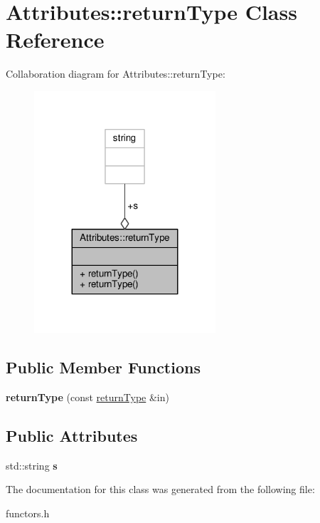 \hypertarget{classAttributes_1_1returnType}{}\section{Attributes\+:\+:return\+Type Class Reference}
\label{classAttributes_1_1returnType}


Collaboration diagram for Attributes\+:\+:return\+Type\+:
\nopagebreak
\begin{figure}[H]
\begin{center}
\leavevmode
\includegraphics[width=191pt]{da/def/classAttributes_1_1returnType__coll__graph}
\end{center}
\end{figure}
\subsection*{Public Member Functions}
\begin{DoxyCompactItemize}
\item 
{\bfseries return\+Type} (const \hyperlink{classAttributes_1_1returnType}{return\+Type} \&in)\hypertarget{classAttributes_1_1returnType_a264a6a93ae35497ce54e62e22d55b5af}{}\label{classAttributes_1_1returnType_a264a6a93ae35497ce54e62e22d55b5af}

\end{DoxyCompactItemize}
\subsection*{Public Attributes}
\begin{DoxyCompactItemize}
\item 
std\+::string {\bfseries s}\hypertarget{classAttributes_1_1returnType_a7815f86609d481ed021a97ba61c561b8}{}\label{classAttributes_1_1returnType_a7815f86609d481ed021a97ba61c561b8}

\end{DoxyCompactItemize}


The documentation for this class was generated from the following file\+:\begin{DoxyCompactItemize}
\item 
functors.\+h\end{DoxyCompactItemize}
